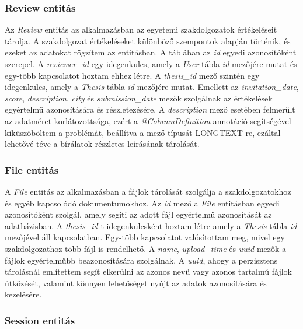 \subsubsection{Review entitás}

Az \textit{Review} entitás az alkalmazásban az egyetemi szakdolgozatok értékeléseit tárolja. A szakdolgozat értékeléseket különböző szempontok alapján történik, és ezeket az adatokat rögzítem az entitásban. A táblában az \textit{id} egyedi azonosítóként szerepel. A \textit{reviewer\_id} egy idegenkulcs, amely a \textit{User} tábla \textit{id} mezőjére mutat és egy-több kapcsolatot hoztam ehhez létre. A \textit{thesis\_id} mező szintén egy idegenkulcs, amely a \textit{Thesis} tábla \textit{id} mezőjére mutat. Emellett az \textit{invitation\_date}, \textit{score}, \textit{description}, \textit{city} és \textit{submission\_date} mezők szolgálnak az értékelések egyértelmű azonosítására és részletezésére. A \textit{description} mező esetében felmerült az adatméret korlátozottsága, ezért a \textit{@ColumnDefinition} annotáció segítségével kiküszöböltem a problémát, beállítva a mező típusát LONGTEXT-re, ezáltal lehetővé téve a bírálatok részletes leírásának tárolását.

\subsubsection{File entitás}

A \textit{File} entitás az alkalmazásban a fájlok tárolását szolgálja a szakdolgozatokhoz és egyéb kapcsolódó dokumentumokhoz. Az \textit{id} mező a \textit{File} entitásban egyedi azonosítóként szolgál, amely segíti az adott fájl egyértelmű azonosítását az adatbázisban. A \textit{thesis\_id}-t idegenkulcsként hoztam létre amely a \textit{Thesis} tábla \textit{id} mezőjével áll kapcsolatban. Egy-több kapcsolatot valósítottam meg, mivel egy szakdolgozathoz több fájl is rendelhető. A \textit{name}, \textit{upload\_time} és \textit{uuid} mezők a fájlok egyértelműbb beazonosítására szolgálnak. A \textit{uuid}, ahogy a perzisztens tárolásnál említettem segít elkerülni az azonos nevű vagy azonos tartalmú fájlok ütközését, valamint könnyen lehetőséget nyújt az adatok azonosítására és kezelésére.

\subsubsection{Session entitás}

